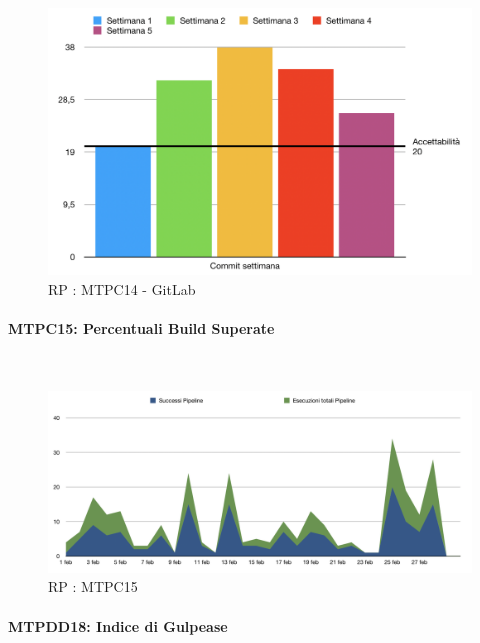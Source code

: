 \begin{figure}[H]
	\begin{center}
		\includegraphics[scale=0.5]{./images/grafici_RP/commitGitlab.png} 
	\end{center}
	\caption{RP : MTPC14 - GitLab}
\end{figure}


\paragraph{MTPC15: Percentuali Build Superate}\-\\
\begin{figure}[H]
	\begin{center}
		\includegraphics[scale=0.4]{./images/grafici_RP/graficoPipeline.png} 
	\end{center}
	\caption{RP : MTPC15}
\end{figure}

\paragraph{MTPDD18: Indice di Gulpease}\-\\
\label{gulpi}

